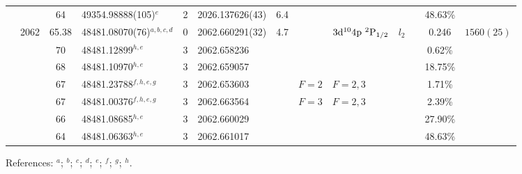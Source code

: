 \begin{table*}
\begin{center}
{\begin{tabular}{:l;l;c;l;c;l;c;l;l;c;c;c;c}
\rowstyle{\itshape}               &        & 64        & 49354.98888(105)$^{e}$           & 2 &   2026.137626(43)  &  6.4 & $                                        $ & $                                        $ & $      $ &              & 48.63\%   & $          $\\
                                  & 2062   & 65.38     & 48481.08070(76)$^{a,b,c,d}$      & 0 &   2062.660291(32)  &  4.7 & $                                        $ & $3\rm{d}^{10}4\rm{p}~^2\rm{P}_{1/2}      $ & $l_{2} $ &              & 0.246     & $ 1560(25) $\\
\rowstyle{\itshape}               &        & 70        & 48481.12899$^{h,e}$              & 3 &   2062.658236      &      & $                                        $ & $                                        $ & $      $ &              & 0.62\%    & $          $\\
\rowstyle{\itshape}               &        & 68        & 48481.10970$^{h,e}$              & 3 &   2062.659057      &      & $                                        $ & $                                        $ & $      $ &              & 18.75\%   & $          $\\
\rowstyle{\itshape}               &        & 67        & 48481.23788$^{f,h,e,g}$          & 3 &   2062.653603      &      & $F=2                                     $ & $F=2,3                                   $ & $      $ &              & 1.71\%    & $          $\\
\rowstyle{\itshape}               &        & 67        & 48481.00376$^{f,h,e,g}$          & 3 &   2062.663564      &      & $F=3                                     $ & $F=2,3                                   $ & $      $ &              & 2.39\%    & $          $\\
\rowstyle{\itshape}               &        & 66        & 48481.08685$^{h,e}$              & 3 &   2062.660029      &      & $                                        $ & $                                        $ & $      $ &              & 27.90\%   & $          $\\
\rowstyle{\itshape}               &        & 64        & 48481.06363$^{h,e}$              & 3 &   2062.661017      &      & $                                        $ & $                                        $ & $      $ &              & 48.63\%   & $          $\\
\hline
\end{tabular}
}
{\footnotesize References:
$^{a}$\citet{Aldenius:2009:014008};
$^{b}$\citet{Pickering:2000:163};
$^{c}$\citet{Ruffoni:2010:424};
$^{d}$\citet{Nave:2012:1570};
$^{e}$\citet{Matsubara:2003:209};
$^{f}$\citet{Campbell:1997:2351};
$^{g}$\citet{Dixit:2008:025001};
$^{h}$\citet{Berengut:2003:022502}.}
\end{center}
\end{table*}
